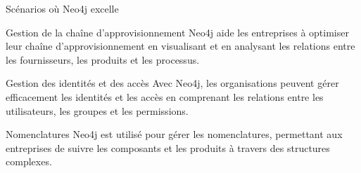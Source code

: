 \begin{frame}{Scénarios où Neo4j excelle}
  \begin{block}{Gestion de la chaîne d'approvisionnement}
    Neo4j aide les entreprises à optimiser leur chaîne d'approvisionnement en visualisant et en analysant les relations entre les fournisseurs, les produits et les processus.
  \end{block}
  \begin{block}{Gestion des identités et des accès}
    Avec Neo4j, les organisations peuvent gérer efficacement les identités et les accès en comprenant les relations entre les utilisateurs, les groupes et les permissions.
  \end{block}
  \begin{block}{Nomenclatures}
    Neo4j est utilisé pour gérer les nomenclatures, permettant aux entreprises de suivre les composants et les produits à travers des structures complexes.
  \end{block}
\end{frame}